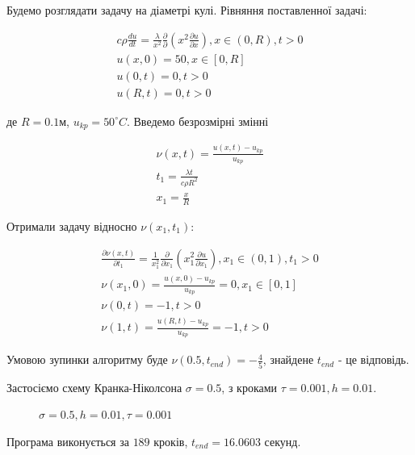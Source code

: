 \documentclass[14pt,a4paper]{scrartcl}
\begin{document}
Будемо розглядати задачу на діаметрі кулі.
Рівняння поставленної задачі:

\begin{gather}
c\rho \frac{du}{dt} = \frac{\lambda}{x^2} \frac{\partial}{\partial}\left( x^2 \frac{\partial u}{\partial x}\right), x \in (0,R), t>0 \label{eq25} \\
u(x,0) = 50, x\in [0,R] \label{eq26}\\
u(0, t) = 0, t>0\label{eq27} \\
u(R, t) = 0 , t>0 \label{eq28}	
\end{gather}

де $R = 0.1 \text{м}$, $u_{kp} = 50^\circ C$. Введемо безрозмірні змінні

\begin{gather}
\nu(x,t) = \frac{u(x,t) - u_{kp}}{u_{kp}} \label{eq29}\\
t_1 = \frac{\lambda t}{c \rho R^2} \label{eq30}\\
x_1 = \frac{x}{R} \label{eq31}
\end{gather}

Отримали задачу відносно $\nu(x_1, t_1)$:

\begin{gather}
\frac{\partial \nu(x,t)}{\partial t_{1}} =  \frac{1}{x^{2}_1} \frac{\partial}{\partial x_{1}}\left( x_{1}^{2} \frac{\partial u}{\partial x_1}\right), x_1 \in (0,1), t_1 >0 \label{eq32} \\
\nu(x_1, 0) = \frac{u(x,0) - u_{kp}}{u_{kp}} = 0 , x_{1} \in [0,1] \label{eq33} \\
\nu(0, t) = -1 , t>0 \label{eq34} \\
\nu(1,t) = \frac{u(R,t) - u_{kp}}{u_{kp}} = -1 , t>0 \label{eq35}
\end{gather}

Умовою зупинки алгоритму буде $\nu(0.5,t_{end}) = -\frac{4}{5}$, знайдене $t_{end}$ - це відповідь.

Застосіємо схему Кранка-Ніколсона $\sigma = 0.5$, з кроками $\tau = 0.001, h = 0.01$.

\begin{figure}[h!]
	\caption{$ \sigma = 0.5, h = 0.01, \tau = 0.001$}
	\label{fig:image}
\end{figure}

Програма виконується за $189$ кроків, $t_{end} = 16.0603$ секунд.
\end{document}
